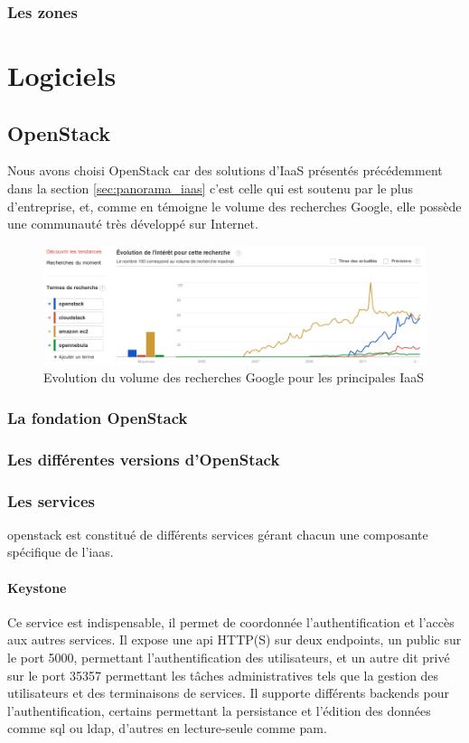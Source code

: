 \documentclass[a4paper,oneside]{report}
\begin{document}
\subsection{Les zones}


\chapter{Logiciels}
\section{OpenStack}
Nous avons choisi OpenStack car des solutions d'IaaS présentés précédemment dans la section \ref{sec:panorama_iaas} c'est celle qui est soutenu par le plus d'entreprise, et, comme en témoigne le volume des recherches Google, elle possède une communauté très développé sur Internet.
\begin{figure}[h!]
\centering
\includegraphics[resolution=140]{images/recherches_iaas.png}
\caption{Evolution du volume des recherches Google pour les principales IaaS}
\end{figure}


\subsection{La fondation OpenStack}

\subsection{Les différentes versions d'OpenStack}


\subsection{Les services}
\gls{openstack} est constitué de différents services gérant chacun une composante spécifique de l'\gls{iaas}.
\subsubsection{Keystone}
Ce service est indispensable, il permet de coordonnée l'authentification et l'accès aux autres services.\newline
Il expose une \gls{api} HTTP(S) sur deux endpoints, un public sur le port 5000, permettant l'authentification des utilisateurs, et un autre dit privé sur le port 35357 permettant les tâches administratives tels que la gestion des utilisateurs et des terminaisons de services.
Il supporte différents backends pour l'authentification, certains permettant la persistance et l'édition des données comme \gls{sql} ou \gls{ldap}, d'autres en lecture-seule comme \gls{pam}.\newline
\end{document}
